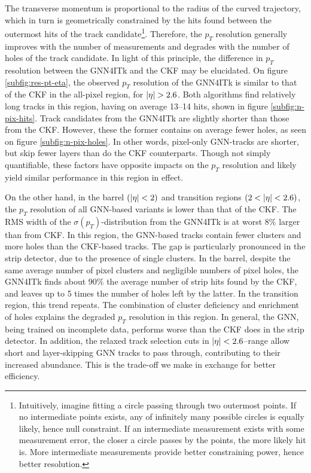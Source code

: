 The transverse momentum is proportional to the radius of the curved trajectory, which in turn is geometrically constrained by the hits found between the outermost hits of the track candidate\footnote{Intuitively, imagine fitting a circle passing through two outermost points. If no intermediate points exists, any of infinitely many possible circles is equally likely, hence null constraint. If an intermediate measurement exists with some measurement error, the closer a circle passes by the points, the more likely hit is. More intermediate measurements provide better constraining power, hence better resolution.}.
Therefore, the $p_T$ resolution generally improves with the number of measurements and degrades with the number of holes of the track candidate. 
In light of this principle, the difference in $p_T$ resolution between the GNN4ITk and the CKF may be elucidated.
On figure \ref{subfig:res-pt-eta}, the observed $p_T$ resolution of the GNN4ITk is similar to that of the CKF in the all-pixel region, for $\abs{\eta}>2.6$.
Both algorithms find relatively long tracks in this region, having on average 13--14 hits, shown in figure \ref{subfig:n-pix-hits}. 
Track candidates from the GNN4ITk are slightly shorter than those from the CKF.
However, these the former contains on average fewer holes, as seen on figure \ref{subfig:n-pix-holes}. 
In other words, pixel-only GNN-tracks are shorter, but skip fewer layers than do the CKF counterparts.
Though not simply quantifiable, these factors have opposite impacts on the $p_T$ resolution and likely yield similar performance in this region in effect.

On the other hand, in the barrel $(\abs{\eta}<2)$ and transition regions $(2<\abs{\eta}<2.6)$, the $p_T$ resolution of all GNN-based variants is lower than that of the CKF.
The RMS width of the $\sigma(p_T)$-distribution from the GNN4ITk is at worst $8\%$ larger than from CKF.
In this region, the GNN-based tracks contain fewer clusters and more holes than the CKF-based tracks.
The gap is particularly pronounced in the strip detector, due to the presence of single clusters. 
In the barrel, despite the same average number of pixel clusters and negligible numbers of pixel holes, the GNN4ITk finds about $90\%$ the average number of strip hits found by the CKF, and leaves up to 5 times the number of holes left by the latter.
In the transition region, this trend repeats.
The combination of cluster deficiency and enrichment of holes explains the degraded $p_T$ resolution in this region.
In general, the GNN, being trained on incomplete data, performs worse than the CKF does in the strip detector. 
In addition, the relaxed track selection cuts in $\abs{\eta}<2.6$--range allow short and layer-skipping GNN tracks to pass through, contributing to their increased abundance.
This is the trade-off we make in exchange for better efficiency.

